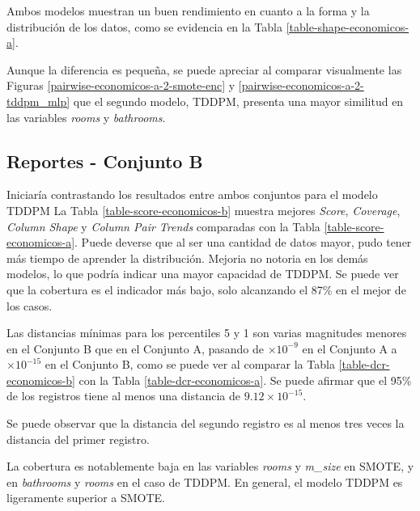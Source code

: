 Ambos modelos muestran un buen rendimiento en cuanto a la forma y la distribución de los datos, como se evidencia en la Tabla \ref{table-shape-economicos-a}.
%

%
\newpage
Aunque la diferencia es pequeña, se puede apreciar al comparar visualmente las Figuras \ref{pairwise-economicos-a-2-smote-enc} y \ref{pairwise-economicos-a-2-tddpm_mlp} que el segundo modelo, TDDPM, presenta una mayor similitud en las variables \emph{rooms} y \emph{bathrooms}.


\newpage
\subsection{Reportes - Conjunto B}
\label{ds-conjunto-b}
Iniciaría contrastando los resultados entre ambos conjuntos para el modelo TDDPM La Tabla \ref{table-score-economicos-b} muestra mejores \emph{Score}, \emph{Coverage}, \emph{Column Shape} y \emph{Column Pair Trends} comparadas con la Tabla \ref{table-score-economicos-a}. Puede deverse que al ser una cantidad de datos mayor, pudo tener más tiempo de aprender la distribución. Mejoria no notoria en los demás modelos, lo que podría indicar una mayor capacidad de TDDPM. Se puede ver que la cobertura es el indicador más bajo, solo alcanzando el 87\% en el mejor de los casos.


\newpage
Las distancias mínimas para los percentiles 5 y 1 son varias magnitudes menores en el Conjunto B que en el Conjunto A, pasando de $\times 10^{-9}$ en el Conjunto A a $\times 10^{-15}$ en el Conjunto B, como se puede ver al comparar la Tabla \ref{table-dcr-economicos-b} con la Tabla \ref{table-dcr-economicos-a}. Se puede afirmar que el 95\% de los registros tiene al menos una distancia de $9.12 \times 10^{-15}$.




\newpage
Se puede observar que la distancia del segundo registro es al menos tres veces la distancia del primer registro.




\newpage
La cobertura es notablemente baja en las variables \emph{rooms} y \emph{m\_size} en SMOTE, y en \emph{bathrooms} y \emph{rooms} en el caso de TDDPM. En general, el modelo TDDPM es ligeramente superior a SMOTE.

